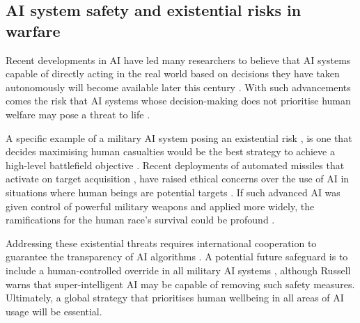 \documentclass[a4paper, 11pt]{article}
\begin{document}
\subsection*{AI system safety and existential risks in warfare}

Recent developments in AI have led many researchers to believe that AI systems capable of directly acting in the real world based on decisions they have taken autonomously will become available later this century \cite{Grace2018}. With such advancements comes the risk that AI systems whose decision-making does not prioritise human welfare may pose a threat to life \cite{Ord2020}. 

A specific example of a military AI system posing an existential risk \cite{yampolskiy2016, Cummings2017}, is one that decides maximising human casualties would be the best strategy to achieve a high-level battlefield objective \cite{Barrat2013}. Recent deployments of automated missiles that activate on target acquisition \cite{Atherton2021, BodeWatts2023},  have raised ethical concerns over the use of AI in situations where human beings are potential targets \cite{Emery2021}. If such advanced AI was given control of powerful military weapons and applied more widely, the ramifications for the human race's survival could be profound \cite{Tegmark2017}. 

Addressing these existential threats requires international cooperation to guarantee the transparency of AI algorithms \cite{Cihon2019, Leslie2019}. A potential future safeguard is to include a human-controlled override in all military AI systems \cite{CritchKrueger2020}, although Russell \cite{Russell2019} warns that super-intelligent AI may be capable of removing such safety measures. Ultimately, a global strategy that prioritises human wellbeing in all areas of AI usage will be essential.


\printbibliography
\end{document}
